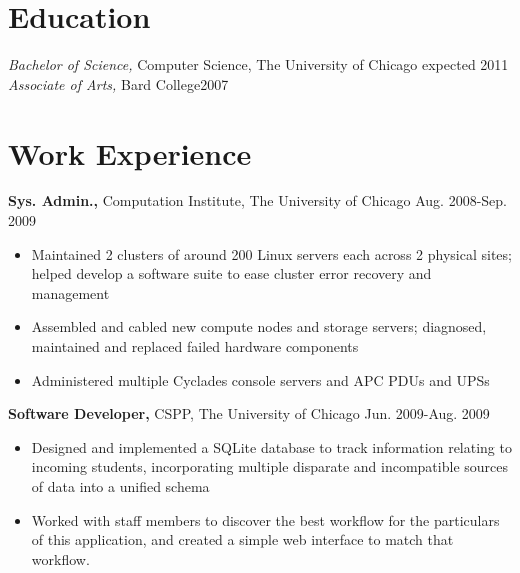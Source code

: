 \documentclass[line,overlapped]{res}
\begin{document}
 
 
 
\address{jalewis@uchicago.edu \hspace{2.3in} Current: 1151 E. 61th St. Apt. 1E, Chicago, IL 60637}
\address{(917) 974-7144 \hspace{2.81in} Permanent: 6 Warren Place, Brooklyn, NY 11201}

 
\newsectionwidth{.2in}
\begin{resume} 
 
\section{Education} 
{\sl Bachelor of Science,} Computer Science, The University of Chicago \hfill expected 2011\\
{\sl Associate of Arts,} Bard College\hfill 2007

\section{Work Experience}
{\bf Sys. Admin.,} Computation Institute, The University of Chicago \hfill Aug. 2008-Sep. 2009
\begin{itemize} \itemsep -2pt %
    \item Maintained 2 clusters of around 200 Linux servers each across 2 physical sites; helped develop a software suite to ease cluster error recovery and management
    \item Assembled and cabled new compute nodes and storage servers; diagnosed, maintained and replaced failed hardware components
    \item Administered multiple Cyclades console servers and APC PDUs and UPSs
\end{itemize} \itemsep -2pt
\vspace{-10pt}
{\bf Software Developer,} CSPP, The University of Chicago \hfill Jun. 2009-Aug. 2009
\begin{itemize}
    \item Designed and implemented a SQLite database to track information relating to incoming students, incorporating multiple disparate and incompatible sources of data into a unified schema
    \item Worked with staff members to discover the best workflow for the particulars of this application, and created a simple web interface to match that workflow.
\end{itemize}
\vspace{-10pt}


\end{resume}
\end{document}
